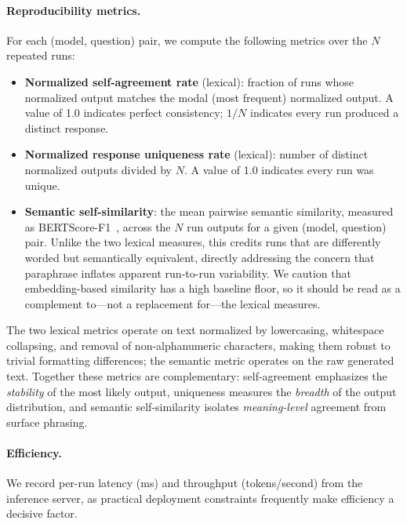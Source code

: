 \documentclass[11pt]{article}
\begin{document}
\paragraph{Reproducibility metrics.}
For each (model, question) pair, we compute the following metrics over
the $N$ repeated runs:

\begin{itemize}
  \item \textbf{Normalized self-agreement rate} (lexical): fraction of
        runs whose normalized output matches the modal (most frequent)
        normalized output.
        A value of 1.0 indicates perfect consistency; $1/N$ indicates
        every run produced a distinct response.
  \item \textbf{Normalized response uniqueness rate} (lexical): number
        of distinct normalized outputs divided by $N$.
        A value of 1.0 indicates every run was unique.
  \item \textbf{Semantic self-similarity}: the mean pairwise
        semantic similarity, measured as BERTScore-F1~\cite{zhang2020bertscore},
        across the $N$ run outputs for a given (model, question) pair.
        Unlike the two lexical measures, this credits runs that are
        differently worded but semantically equivalent, directly
        addressing the concern that paraphrase inflates apparent
        run-to-run variability. We caution that embedding-based
        similarity has a high baseline floor, so it should be read as a
        complement to---not a replacement for---the lexical measures.
\end{itemize}

The two lexical metrics operate on text normalized by lowercasing,
whitespace collapsing, and removal of non-alphanumeric characters,
making them robust to trivial formatting differences; the semantic
metric operates on the raw generated text.
Together these metrics are complementary: self-agreement emphasizes
the \emph{stability} of the most likely output, uniqueness
measures the \emph{breadth} of the output distribution, and semantic
self-similarity isolates \emph{meaning-level} agreement from surface
phrasing.

\paragraph{Efficiency.}
We record per-run latency (ms) and throughput (tokens/second)
from the inference server, as practical deployment constraints
frequently make efficiency a decisive factor.
\end{document}
